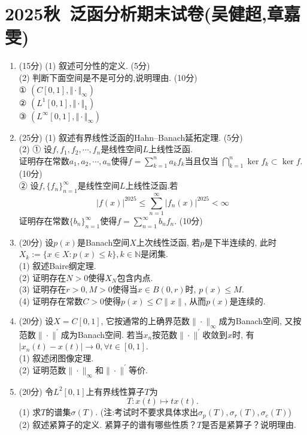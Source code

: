 \section{2025秋\ 泛函分析期末试卷(吴健超,章嘉雯)}
\begin{enumerate}
\item (15分)
(1) 叙述可分性的定义. (5分) \\
(2) 判断下面空间是不是可分的,说明理由. (10分)\\
① $\left(C[0,1],\Vert \cdot \Vert_{\infty}\right)$\\ 
② $\left(L^{1}[0,1],\Vert \cdot \Vert_{1}\right)$\\
③ $\left(L^{\infty}[0,1],\Vert \cdot \Vert_{\infty}\right)$

\item (25分)
(1) 叙述有界线性泛函的Hahn--Banach延拓定理. (5分)\\
(2) ①  设$f,f_1,f_2,\cdots,f_n$是线性空间$L$上线性泛函.\\
证明存在常数$a_1,a_2,\cdots,a_n$使得$f=\displaystyle \sum_{k=1}^{n}a_k f_k$当且仅当
$\displaystyle\bigcap_{k=1}^{n}\ker f_k \subset \ker f$. (10分) \\
② 设$f,\{f_n\}_{n=1}^{\infty}$是线性空间$L$上线性泛函.若
\begin{equation*}
    |f(x)|^{2025} \leq \sum_{n=1}^{\infty}|f_n(x)|^{2025} < \infty
\end{equation*}
证明存在常数$\{b_n\}_{n=1}^{\infty}$使得$f=\displaystyle \sum_{n=1}^{\infty} b_n f_n$. (10分)

\item (20分) 设$p(x)$是Banach空间$X$上次线性泛函, 若$p$是下半连续的, 此时$X_k:=\{x \in X:p(x) \leq k \},k \in \mathbb{N}$是闭集.\\
(1) 叙述Baire纲定理. \\
(2) 证明存在$N>0$使得$X_N$包含内点. \\
(3) 证明存在$r>0,M>0$使得当$ x \in B(0,r)$时, $p(x) \leq M$.\\ 
(4) 证明存在常数$C>0$使得$p(x) \leq C \|x\|$, 从而$p(x)$是连续的.

\item (20分) 设$X=C[0,1]$, 它按通常的上确界范数$\|\cdot\|_{\infty}$成为Banach空间, 又按范数$\|\cdot\|^{\prime}$成为Banach空间.
若当$x_n$按范数$\|\cdot\|^{\prime}$收敛到$x$时, 有$|x_n(t)-x(t)| \to 0, \forall t \in [0,1]$.\\
(1) 叙述闭图像定理.\\
(2) 证明范数$\|\cdot\|_{\infty}$和$\|\cdot\|^{\prime}$等价.

\item (20分) 令$L^{2}[0,1]$上有界线性算子$T$为
\begin{equation*}
    T:x(t) \mapsto tx(t).
\end{equation*}
(1) 求$T$的谱集$\sigma(T)$. (注:考试时不要求具体求出$\sigma_{p}(T),\sigma_{r}(T), \sigma_{c}(T)$) \\
(2) 叙述紧算子的定义. 紧算子的谱有哪些性质？$T$是否是紧算子？说明理由.
\end{enumerate}

